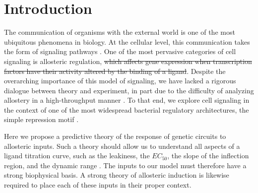\section*{Introduction}


The communication of organisms with the external world is one of the most
ubiquitous phenomena in biology. At the cellular level, this communication takes
the form of signaling pathways . One of the most pervasive categories of cell signaling is allosteric
regulation,  \sout{which
	affects gene expression when transcription factors have their activity altered
	by the binding of a ligand}. Despite the overarching importance of this model of
signaling, we have lacked a rigorous dialogue between theory and experiment, in
part due to the difficulty of analyzing allostery in a high-throughput manner
\cite{Lindsley2006}. To that end, we explore cell signaling in the context of
one of the most widespread bacterial regulatory architectures, the simple
repression motif \cite{Rydenfelt2014}.


Here we propose a predictive theory of the response of genetic circuits to
allosteric inputs. Such a theory should allow us to understand all aspects of a
ligand titration curve, such as the leakiness, the $EC_{50}$, the slope of the
inflection region, and the dynamic range . The inputs to
our model must therefore have a strong biophysical basis. A strong theory of
allosteric induction is likewise required to place each of these inputs in their
proper context. 

